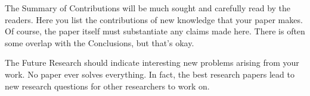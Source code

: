 \documentclass[11pt]{article}       %
\begin{document}
The Summary of Contributions will be much sought and carefully read by the readers. Here you list the contributions of new knowledge that your paper makes. Of course, the paper itself must substantiate any claims made here. There is often some overlap with the Conclusions, but that’s okay.

The Future Research should indicate interesting new problems arising from your work. No paper ever solves everything. In fact, the best research papers lead to new research questions for other researchers to work on.




\end{document}
